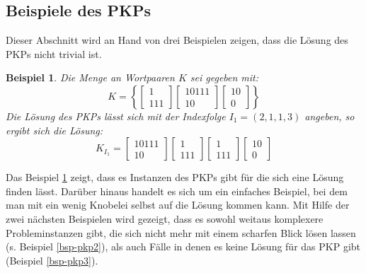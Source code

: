 \documentclass[]{scrartcl}
\newtheorem{bsp}[definition]{Beispiel}
\begin{document}
	\subsection{Beispiele des PKPs}
		
		Dieser Abschnitt wird an Hand von drei Beispielen zeigen, dass die Lösung des PKPs nicht trivial ist.

		\begin{bsp}
			\label{bsp-pkp1}
			Die Menge an Wortpaaren $K$ sei gegeben mit: \[K = \left\lbrace \begin{bmatrix}
					1 \\ 111
				\end{bmatrix}
				\begin{bmatrix}
					10111 \\ 10
				\end{bmatrix}
				\begin{bmatrix}
					10 \\ 0
				\end{bmatrix}\right\rbrace \]
				Die Lösung des PKPs lässt sich mit der Indexfolge $I_1 = (2, 1, 1, 3)$ angeben, so ergibt sich die Lösung:
				\[K_{I_1} = \begin{bmatrix}
								10111 \\ 10
							\end{bmatrix} \begin{bmatrix}
								1 \\ 111
							\end{bmatrix} \begin{bmatrix}
								1 \\ 111
							\end{bmatrix} \begin{bmatrix}
								10 \\ 0
							\end{bmatrix}\]
		\end{bsp}
		
		Das Beispiel \ref{bsp-pkp1} zeigt, dass es Instanzen des PKPs gibt für die sich eine Lösung finden lässt. Darüber hinaus handelt es sich um ein einfaches Beispiel, bei dem man mit ein wenig Knobelei selbst auf die Lösung kommen kann. Mit Hilfe der zwei nächsten Beispielen wird gezeigt, dass es sowohl weitaus komplexere Probleminstanzen gibt, die sich nicht mehr mit einem scharfen Blick lösen lassen (s. Beispiel \ref{bsp-pkp2}), als auch Fälle in denen es keine Lösung für das PKP gibt (Beispiel \ref{bsp-pkp3}).
		
\end{document}
